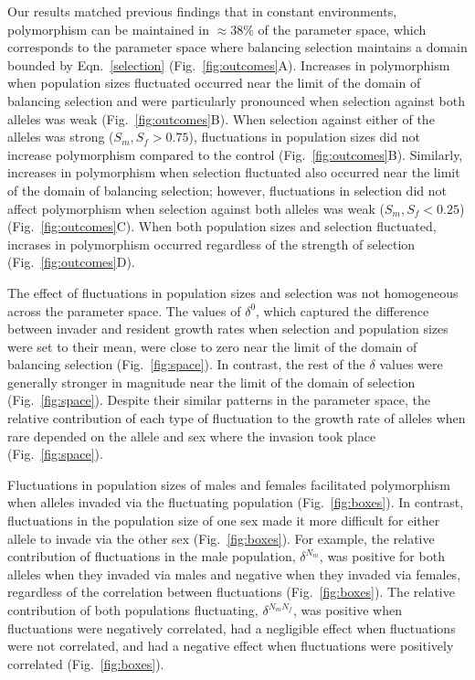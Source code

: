 \documentclass[12pt]{article}
\begin{document}
Our results matched previous findings that in constant environments, polymorphism can be maintained in $ \approx 38\%$ of the parameter space, which corresponds to the parameter space where balancing selection maintains a domain bounded by Eqn.~\ref{selection} (Fig.~\ref{fig:outcomes}A). Increases in polymorphism when population sizes fluctuated occurred near the limit of the domain of balancing selection and were particularly pronounced when selection against both alleles was weak (Fig.~\ref{fig:outcomes}B). When selection against either of the alleles was strong ($ S_{m}, S_{f}> 0.75 $), fluctuations in population sizes did not increase polymorphism compared to the control (Fig.~\ref{fig:outcomes}B). Similarly, increases in polymorphism when selection fluctuated also occurred near the limit of the domain of balancing selection; however, fluctuations in selection did not affect polymorphism when selection against both alleles was weak ($ S_{m}, S_{f}< 0.25 $) (Fig.~\ref{fig:outcomes}C). When both population sizes and selection fluctuated, incrases in polymorphism occurred regardless of the strength of selection (Fig.~\ref{fig:outcomes}D).

The effect of fluctuations in population sizes and selection was not homogeneous across the parameter space. The values of $\delta^{0}$, which captured the difference between invader and resident growth rates when selection and population sizes were set to their mean, were close to zero near the limit of the domain of balancing selection (Fig.~\ref{fig:space}). In contrast, the rest of the $\delta$ values were generally stronger in magnitude near the limit of the domain of selection  (Fig.~\ref{fig:space}). Despite their similar patterns in the parameter space, the relative contribution of each type of fluctuation to the growth rate of alleles when rare depended on the allele and sex where the invasion took place (Fig.~\ref{fig:space}).

Fluctuations in population sizes of males and females facilitated polymorphism when alleles invaded via the fluctuating population (Fig.~\ref{fig:boxes}). In contrast, fluctuations in the population size of one sex made it more difficult for either allele to invade via the other sex (Fig.~\ref{fig:boxes}). For example, the relative contribution of fluctuations in the male population, $\delta^{N_{m}}$, was positive for both alleles when they invaded via males and negative when they invaded via females, regardless of the correlation between fluctuations (Fig.~\ref{fig:boxes}). The relative contribution of both populations fluctuating,  $\delta^{N_{m}N_{f}}$, was positive when fluctuations were negatively correlated, had a negligible effect when fluctuations were not correlated, and had a negative effect when fluctuations were positively correlated (Fig.~\ref{fig:boxes}).
\end{document}
